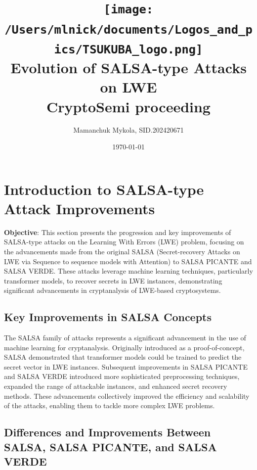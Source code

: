 \documentclass{article}
\title{
    \texttt{[image: /Users/mlnick/documents/Logos\_and\_pics/TSUKUBA\_logo.png]} \\
    \vspace{3mm}
    \textbf{Evolution of SALSA-type Attacks on LWE} \\
    \vspace{3mm}    
    CryptoSemi proceeding
}
\author{Mamanchuk Mykola, SID.202420671}
\date{\today}
\begin{document}
\maketitle

\section{Introduction to SALSA-type Attack Improvements}

\textbf{Objective}: This section presents the progression and key improvements of SALSA-type attacks on the Learning With Errors (LWE) problem, focusing on the advancements made from the original SALSA (Secret-recovery Attacks on LWE via Sequence to sequence models with Attention) to SALSA PICANTE and SALSA VERDE. These attacks leverage machine learning techniques, particularly transformer models, to recover secrets in LWE instances, demonstrating significant advancements in cryptanalysis of LWE-based cryptosystems.

\subsection{Key Improvements in SALSA Concepts}

The SALSA family of attacks represents a significant advancement in the use of machine learning for cryptanalysis. Originally introduced as a proof-of-concept, SALSA demonstrated that transformer models could be trained to predict the secret vector in LWE instances. Subsequent improvements in SALSA PICANTE and SALSA VERDE introduced more sophisticated preprocessing techniques, expanded the range of attackable instances, and enhanced secret recovery methods. These advancements collectively improved the efficiency and scalability of the attacks, enabling them to tackle more complex LWE problems.

\subsection{Differences and Improvements Between SALSA, SALSA PICANTE, and SALSA VERDE}
\end{document}
